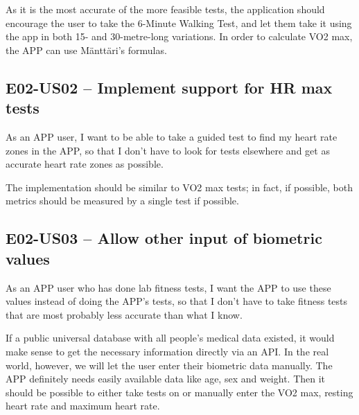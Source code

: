 As it is the most accurate of the more feasible tests, the application should encourage the user to take the 6-Minute Walking Test, and let them take it using the app in both 15- and 30-metre-long variations.
In order to calculate VO2 max, the APP can use Mänttäri's formulas.

\subsection*{E02-US02 -- Implement support for HR max tests}
As an APP user, I want to be able to take a guided test to find my heart rate zones in the APP, so that I don't have to look for tests elsewhere and get as accurate heart rate zones as possible.

The implementation should be similar to VO2 max tests; in fact, if possible, both metrics should be measured by a single test if possible.

\subsection*{E02-US03 -- Allow other input of biometric values}
As an APP user who has done lab fitness tests, I want the APP to use these values instead of doing the APP's tests, so that I don't have to take fitness tests that are most probably less accurate than what I know.

If a public universal database with all people's medical data existed, it would make sense to get the necessary information directly via an API.
In the real world, however, we will let the user enter their biometric data manually.
The APP definitely needs easily available data like age, sex and weight.
Then it should be possible to either take tests on or manually enter the VO2 max, resting heart rate and maximum heart rate.

